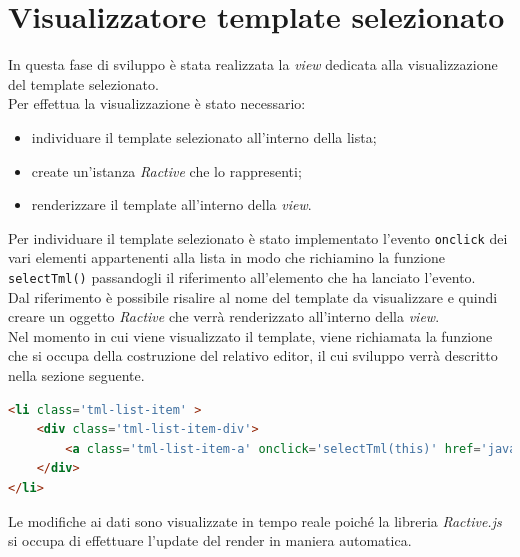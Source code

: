 \section{Visualizzatore template selezionato}
In questa fase di sviluppo è stata realizzata la \textit{view} dedicata alla visualizzazione del template selezionato.\\
Per effettua la visualizzazione è stato necessario:
\begin{itemize}
	\item individuare il template selezionato all'interno della lista;
	\item create un'istanza \textit{Ractive} che lo rappresenti;
	\item renderizzare il template all'interno della \textit{view}.
\end{itemize}
Per individuare il template selezionato è stato implementato l'evento \texttt{onclick} dei vari elementi appartenenti alla lista in modo che richiamino la funzione \texttt{selectTml()} passandogli il riferimento all'elemento che ha lanciato l'evento.\\
Dal riferimento è possibile risalire al nome del template da visualizzare e quindi creare un oggetto \textit{Ractive} che verrà renderizzato all'interno della \textit{view}.\\
Nel momento in cui viene visualizzato il template, viene richiamata la funzione che si occupa della costruzione del relativo editor, il cui sviluppo verrà descritto nella sezione seguente.
\begin{lstlisting}[language=HTML, caption=Chiamata di \texttt{selectTml()} all'evento \texttt{onclick} del list item.]
<li class='tml-list-item' >
	<div class='tml-list-item-div'>
		<a class='tml-list-item-a' onclick='selectTml(this)' href='javascript:void(0)' id='"+type+i+"'></a>
	</div>
</li>
\end{lstlisting}
Le modifiche ai dati sono visualizzate in tempo reale poiché la libreria \textit{Ractive.js} si occupa di effettuare l'update del render in maniera automatica.

